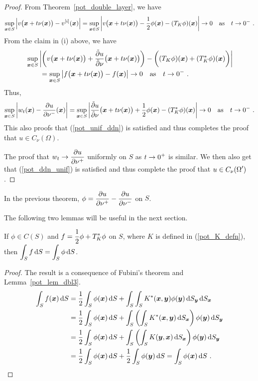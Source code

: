 \begin{proof}
From Theorem~\ref{pot_double_layer}, we have
\[
\sup_{{\bm{x}}\in S}
\left|v\big({\bm{x}}+t\nu({\bm{x}})\big) - v^{[i]}({\bm{x}})\right|
= \sup_{{\bm{x}}\in S}
\left|v\big({\bm{x}}+t\nu({\bm{x}})\big) -
\frac{1}{2} \phi({\bm{x}}) - (T_K \phi)({\bm{x}}) \right|
\rightarrow 0 \quad \text{as} \quad t\rightarrow 0^-\ .
\]
From the claim in (i) above, we have
\begin{align*}
&\sup_{{\bm{x}}\in S}
\left| \left(v\big({\bm{x}}+t\nu({\bm{x}})\big)
+ \frac{\tilde{\partial}{u}}{\tilde{\partial}{\nu}}\big({\bm{x}}+t\nu({\bm{x}})\big)\right) -
\bigg( (T_K \phi)({\bm{x}}) + (T_K^\ast \phi)({\bm{x}})\bigg) \right| \\
&\qquad = \sup_{{\bm{x}}\in S}
\left| f\big({\bm{x}}+t\nu({\bm{x}})\big) - f({\bm{x}}) \right|
\rightarrow 0 \quad \text{as} \quad t \rightarrow 0^- \ .
\end{align*}
Thus,
\[
\sup_{{\bm{x}}\in S} \left| w_t({\bm{x}})
- \frac{\partial{u}}{\partial \nu^-}({\bm{x}}) \right|
= \sup_{{\bm{x}}\in S} \left| 
\frac{\tilde{\partial}{u}}{\tilde{\partial}{\nu}}\big({\bm{x}}+t\nu({\bm{x}})\big)
+ \frac{1}{2} \phi({\bm{x}}) - (T_K^\ast \phi)({\bm{x}}) \right|
\to 0 \quad \text{as} \quad
t\rightarrow 0^- \ .
\]
This also proofs
that (\ref{pot_unif_ddn}) is satisfied and thus completes the proof that
$u \in C_{\nu}(\Omega)$.

The proof that $\displaystyle w_t \rightarrow \frac{\partial{u}}{\partial \nu^+}$
uniformly on $S$ as $\displaystyle t\rightarrow 0^+$ is similar.  We
then also get that (\ref{pot_ddn_unif}) is satisfied and thus complete
the proof that $\displaystyle u \in C_{\nu}(\Omega^{\prime})$.
\end{proof}

\begin{cor} \label{pot_cor_pdpdm}
In the previous theorem,
$\displaystyle \phi = \frac{\partial{u}}{\partial \nu^+}- \frac{\partial{u}}{\partial \nu^-}$ on $S$.
\end{cor}

The following two lemmas will be useful in the next section.

\begin{lemma} \label{pot_sol_zeroB}
If $\phi \in C(S)$ and $\displaystyle f = \frac{1}{2} \phi + T^\ast_K \phi$ on
$S$, where $K$ is defined in (\ref{pot_K_defn}), then
$\displaystyle \int_{S} f \,\mathrm{d}{S} = \int_{S} \phi \,\mathrm{d}{S}$.
\end{lemma}

\begin{proof}
The result is a consequence of Fubini's theorem and
Lemma~\ref{pot_lem_dbl3}.
\begin{align*}
\int_S f({\bm{x}}) \,\mathrm{d}{S} &= \frac{1}{2} \int_S \phi({\bm{x}}) \,\mathrm{d}{S} + 
\int_S \int_S K^\ast({\bm{x}},{\bm{y}}) \phi({\bm{y}}) \,\mathrm{d}{S}_{{\bm{y}}} \,\mathrm{d}{S}_{{\bm{x}}} \\
&= \frac{1}{2} \int_S \phi({\bm{x}}) \,\mathrm{d}{S} + 
\int_S \left( \int_S K^\ast({\bm{x}},{\bm{y}}) \,\mathrm{d}{S}_{{\bm{x}}} \right)
\phi({\bm{y}}) \,\mathrm{d}{S}_{{\bm{y}}} \\
&= \frac{1}{2} \int_S \phi({\bm{x}}) \,\mathrm{d}{S} + 
\int_S \left( \int_S K({\bm{y}},{\bm{x}}) \,\mathrm{d}{S}_{{\bm{x}}} \right)
\phi({\bm{y}}) \,\mathrm{d}{S}_{{\bm{y}}} \\
&= \frac{1}{2} \int_S \phi({\bm{x}}) \,\mathrm{d}{S}
+ \frac{1}{2} \int_S \phi({\bm{y}}) \,\mathrm{d}{S}
= \int_S \phi({\bm{x}}) \,\mathrm{d}{S} \ . \qedhere
\end{align*}
\end{proof}

